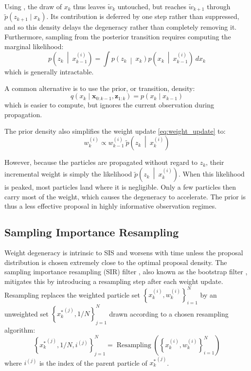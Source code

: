 Using , the draw of $x_k$ thus leaves $\tilde{w}_k$ untouched, but reaches $\tilde{w}_{k+1}$ through $\tilde{p}(z_{k+1}\mid x_k)$. Its contribution is deferred by one step rather than suppressed, and so this density delays the degeneracy rather than completely removing it. Furthermore, sampling from the posterior transition requires computing the marginal likelihood:
\begin{equation}
	p\left(z_k\:\middle|\:x_{k-1}^{(i)}\right)=\int{p\left(z_k\:\middle|\:x_k\right)p\left(x_k\:\middle|\:x_{k-1}^{(i)}\right)\:dx_k}
\end{equation}
which is generally intractable.

A common alternative is to use the prior, or transition, density:
\begin{equation}
	q(x_k\mid\mathbf{x}_{0:k-1},\mathbf{z}_{1:k})=p(x_k\mid x_{k-1})\label{eq:prior_proposal}
\end{equation}
which is easier to compute, but ignores the current observation during propagation.

The prior density also simplifies the weight update \eqref{eq:weight_update} to:
\begin{equation}
	w_k^{(i)}\propto w_{k-1}^{(i)}\:\tilde{p}\left(z_k\:\middle|\:x_k^{(i)}\right)\label{eq:weight_update_prior}
\end{equation}

However, because the particles are propagated without regard to $z_k$, their incremental weight is simply the likelihood $\tilde{p}\left(z_k\:\middle|\:x_k^{(i)}\right)$. When this likelihood is peaked, most particles land where it is negligible. Only a few particles then carry most of the weight, which causes the degeneracy to accelerate. The prior is thus a less effective proposal in highly informative observation regimes.

\subsection{Sampling Importance Resampling}

Weight degeneracy is intrinsic to SIS and worsens with time unless the proposal distribution is chosen extremely close to the optimal proposal density. The sampling importance resampling (SIR) filter \cite{bib:SIR}, also known as the bootstrap filter \cite{bib:bootstrap-filter}, mitigates this by introducing a resampling step after each weight update. Resampling replaces the weighted particle set $\left\{x_k^{(i)},w_k^{(i)}\right\}_{i=1}^N$ by an unweighted set $\left\{{x_k^*}^{(j)},1/N\right\}_{j=1}^N$ drawn according to a chosen resampling algorithm:
\begin{equation}
	\left\{{x^*_k}^{(j)},1/N,i^{(j)}\right\}_{j=1}^N=\operatorname{Resampling}\left(\left\{x_k^{(i)},w_k^{(i)}\right\}_{i=1}^N\right)\label{eq:resampling}
\end{equation}
where $i^{(j)}$ is the index of the parent particle of ${x^*_k}^{(j)}$.

